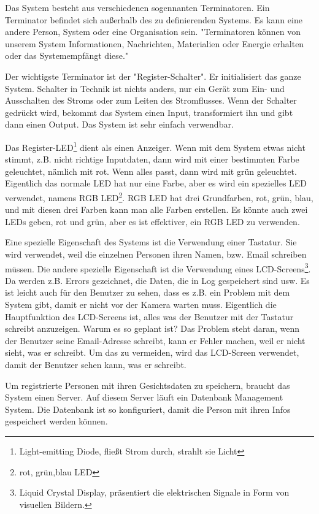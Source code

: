 Das System besteht aus verschiedenen sogennanten Terminatoren.
Ein  Terminator  befindet  sich  au{\ss}erhalb  des  zu  definierenden  Systems.  Es  kann  eine andere Person, System oder eine Organisation sein. "Terminatoren k\"onnen von unserem System Informationen, Nachrichten, Materialien oder Energie erhalten oder das Systemempf\"angt diese."\cite{terminator}

Der wichtigste Terminator ist der "Register-Schalter". Er initialisiert das ganze System. Schalter in Technik ist nichts anders, nur ein Ger\"at zum Ein- und Ausschalten des Stroms oder zum Leiten des Stromflusses. Wenn der Schalter gedr\"uckt wird, bekommt das System einen Input, transformiert ihn und gibt dann einen Output. Das System ist sehr einfach verwendbar.

Das Register-LED\footnote{Light-emitting Diode, flie{\ss}t Strom durch, strahlt sie Licht} dient als einen Anzeiger. Wenn mit dem System etwas nicht stimmt, z.B. nicht richtige Inputdaten, dann wird mit einer bestimmten Farbe geleuchtet, n\"amlich mit rot. Wenn alles passt, dann wird mit gr\"un geleuchtet. Eigentlich das normale LED hat nur eine Farbe, aber es wird ein spezielles LED verwendet, namens RGB LED\footnote{rot, gr\"un,blau LED}. RGB LED hat drei Grundfarben, rot, gr\"un, blau, und mit diesen drei Farben kann man alle Farben erstellen. Es k\"onnte auch zwei LEDs geben, rot und gr\"un, aber es ist effektiver, ein RGB LED zu verwenden.


Eine spezielle Eigenschaft des Systems ist die Verwendung einer Tastatur. Sie wird verwendet, weil die einzelnen Personen ihren Namen, bzw. Email schreiben m\"ussen. 
Die andere spezielle Eigenschaft ist die Verwendung eines LCD-Screens\footnote{Liquid Crystal Display, präsentiert die elektrischen Signale in Form von visuellen Bildern.}. Da werden z.B. Errors gezeichnet, die Daten, die in Log gespeichert sind usw. Es ist leicht auch f\"ur den Benutzer zu sehen, dass es z.B. ein Problem mit dem System gibt, damit er nicht vor der Kamera warten muss. Eigentlich die Hauptfunktion des LCD-Screens ist, alles was der Benutzer mit der Tastatur schreibt anzuzeigen. Warum es so geplant ist? Das Problem steht daran, wenn der Benutzer seine Email-Adresse schreibt, kann er Fehler machen, weil er nicht sieht, was er schreibt. Um das zu vermeiden, wird das LCD-Screen verwendet, damit der Benutzer sehen kann, was er schreibt.

Um registrierte Personen mit ihren Gesichtsdaten zu speichern, braucht das System einen Server. Auf diesem Server l\"auft ein Datenbank Management System. Die Datenbank ist so konfiguriert, damit die Person mit ihren Infos gespeichert werden k\"onnen. 

